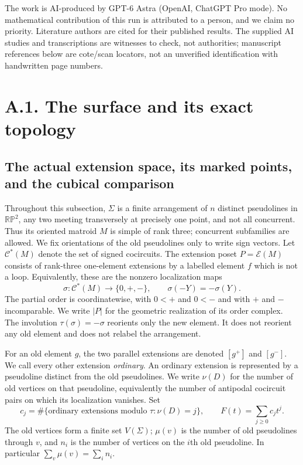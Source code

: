 \documentclass[11pt,a4paper]{article}
\begin{document}
The work is AI-produced by GPT-6 Astra (OpenAI, ChatGPT Pro mode).
No mathematical contribution of this run is attributed to a person,
and we claim no priority. Literature authors are cited for their
published results. The supplied AI studies and transcriptions are
witnesses to check, not authorities; manuscript references below are
cote/scan locators, not an unverified identification with handwritten
page numbers.
\section{A.1. The surface and its exact topology}
\subsection{The actual extension space, its marked points, and the cubical comparison}

Throughout this subsection, $\Sigma$ is a finite arrangement of $n$ distinct
pseudolines in $\mathbb {RP}^{2}$, any two meeting transversely at precisely one
point, and not all concurrent. Thus its oriented matroid $M$ is simple of rank
three; concurrent subfamilies are allowed. We fix orientations of the old
pseudolines only to write sign vectors. Let $\mathcal C^*(M)$ denote the set of
signed cocircuits. The extension poset $P=\mathcal E(M)$ consists of rank-three
one-element extensions by a labelled element $f$ which is not a loop. Equivalently,
these are the nonzero localization maps
\[
 \sigma:\mathcal C^*(M)\longrightarrow\{0,+,-\},\qquad
 \sigma(-Y)=-\sigma(Y).
\]
The partial order is coordinatewise, with $0<+$ and $0<-$ and with $+$ and $-$
incomparable. We write $|P|$ for the geometric realization of its order complex.
The involution $\tau(\sigma)=-\sigma$ reorients only the new element. It does not
reorient any old element and does not relabel the arrangement.

For an old element $g$, the two parallel extensions are denoted $[g^+]$ and
$[g^-]$. We call every other extension \emph{ordinary}. An ordinary extension
is represented by a pseudoline distinct from the old pseudolines. We write
$\nu(D)$ for the number of old vertices on that pseudoline, equivalently the
number of antipodal cocircuit pairs on which its localization vanishes. Set
\[
 c_j=\#\{\text{ordinary extensions modulo }\tau:\nu(D)=j\},
 \qquad F(t)=\sum_{j\geq0}c_jt^j.
\]
The old vertices form a finite set $V(\Sigma)$; $\mu(v)$ is the number of old
pseudolines through $v$, and $n_i$ is the number of vertices on the $i$th old
pseudoline. In particular $\sum_v\mu(v)=\sum_i n_i$.
\end{document}
